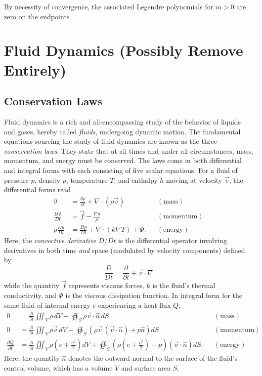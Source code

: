 \documentclass[11pt,dvipsnames]{thesis}
\begin{document}
By necessity of convergence, the associated Legendre polynomials for $m > 0$ are zero on the endpoints














\chapter{Fluid Dynamics (Possibly Remove Entirely)}
\section{Conservation Laws}
Fluid dynamics is a rich and all-encompassing study of the behavior of liquids and gases, hereby called \textit{fluids}, undergoing dynamic motion. The fundamental equations sourcing the study of fluid dynamics are known as the three \textit{conservation laws}. They state that at all times and under all circumstances, mass, momentum, and energy must be conserved. The laws come in both differential and integral forms with each consisting of five scalar equations. For a fluid of pressure $p$, density $\rho$, temperature $T$, and enthalpy $h$ moving at velocity $\vec{v}$, the differential forms read
\begin{align}
0 &= \frac{\partial \rho}{\partial t} + \nabla \cdot (\rho \vec{v}) && (\text{mass}) \label{eq:ConsofMassDiff} \\
\frac{D\vec{v}}{Dt} &= \vec{f} - \frac{\nabla p}{\rho} && (\text{momentum}) \\
\rho \frac{Dh}{Dt} &= \frac{Dp}{Dt} + \nabla \cdot (k \nabla T) + \Phi. && (\text{energy})
\end{align}
Here, the \textit{convective derivative} $D/Dt$ is the differential operator involving derivatives in both time \textit{and} space (modulated by velocity components) defined by
\begin{equation}
\frac{D}{Dt} = \frac{\partial}{\partial t} + \vec{v} \cdot \nabla
\end{equation}
while the quantity $\vec{f}$ represents viscous forces, $k$ is the fluid's thermal conductivity, and $\Phi$ is the viscous dissipation function.
%
In integral form for the same fluid of internal energy $e$ experiencing a heat flux $Q$,
\begin{align}
0 &= \frac{\partial}{\partial t} \iiint_V \rho \, dV + \oiint_S \rho \vec{v} \cdot \hat{n} \,dS && (\text{mass}) \\
0 &= \frac{\partial}{\partial t} \iiint_V \rho \vec{v} \,dV + \oiint_S \left(\rho \vec{v} \, (\vec{v} \cdot \hat{n}) + p\hat{n}\right) dS && (\text{momentum}) \\
\frac{\partial Q}{\partial t} &= \frac{\partial}{\partial t} \iiint_V \rho \left(e + \frac{v^2}{2}\right) dV + \oiint_S \left(\rho \left(e + \frac{v^2}{2}\right) + p\right) (\vec{v} \cdot \hat{n}) dS. && (\text{energy}) 
\end{align}
Here, the quantity $\hat{n}$ denotes the outward normal to the surface of the fluid's control volume, which has a volume $V$ and surface area $S$.
\end{document}
